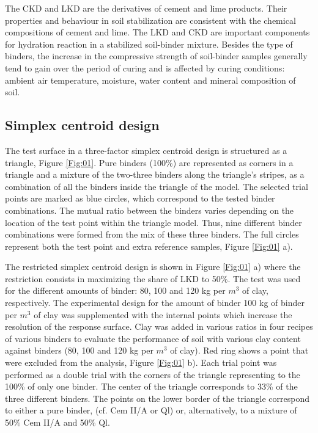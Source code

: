 \documentclass[USenglish,twocolumn]{article}
\begin{document}
The CKD and LKD are the derivatives of cement and lime products. Their properties and behaviour in soil stabilization are consistent with the chemical compositions of cement and lime. The LKD and CKD are important components for hydration reaction in a stabilized soil-binder mixture. Besides the type of binders, the increase in the compressive strength of soil-binder samples generally tend to gain over the period of curing and is affected by curing conditions: ambient air temperature, moisture, water content and mineral composition of soil.

\subsection{Simplex centroid design}

The test surface in a three-factor simplex centroid design is structured as a triangle, Figure \ref{Fig:01}. Pure binders (100\%) are represented as corners in a triangle and a mixture of the two-three binders along the triangle's stripes, as a combination of all the binders inside the triangle of the model. The selected trial points are marked as blue circles, which correspond to the tested binder combinations. The mutual ratio between the binders varies depending on the location of the test point within the triangle model. Thus, nine different binder combinations were formed from the mix of these three binders. The full circles represent both the test point and extra reference samples, Figure \ref{Fig:01} a). 

The restricted simplex centroid design is shown in Figure \ref{Fig:01} a) where the restriction consists in maximizing the share of LKD to 50\%. The test was used for the different amounts of binder: 80, 100 and 120 kg per $m^3$ of clay, respectively. The experimental design for the amount of binder 100 kg of binder per $m^3$ of clay was supplemented with the internal points which increase the resolution of the response surface. Clay was added in various ratios in four recipes of various binders to evaluate the performance of soil with various clay content against binders (80, 100 and 120 kg per $m^3$ of clay). Red ring shows a point that were excluded from the analysis, Figure  \ref{Fig:01} b). Each trial point was performed as a double trial with the corners of the triangle representing to the 100\% of only one binder. The center of the triangle corresponds to 33\% of the three different binders. The points on the lower border of the triangle correspond to either a pure binder, (cf. Cem II/A or Ql) or, alternatively, to a mixture of 50\% Cem II/A and 50\% Ql. 
\end{document}
